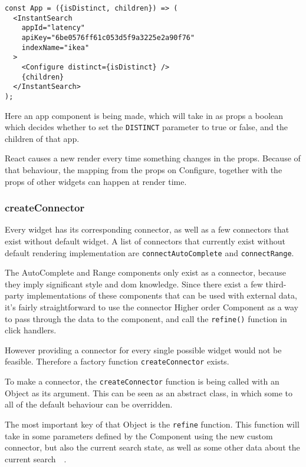 \begin{minipage}{\linewidth}
\begin{lstlisting}[caption={Configure in an InstantSearch container},label={lst:ris-configure}]
const App = ({isDistinct, children}) => (
  <InstantSearch
    appId="latency"
    apiKey="6be0576ff61c053d5f9a3225e2a90f76"
    indexName="ikea"
  >
    <Configure distinct={isDistinct} />
    {children}
  </InstantSearch>
);
\end{lstlisting}
\end{minipage}

Here an app component is being made, which will take in as \gls{props} a boolean which decides whether to set the {\tt DISTINCT} parameter to true or false, and the children of that app.

React causes a new render every time something changes in the \gls{props}. Because of that behaviour, the mapping from the \gls{props} on Configure, together with the \gls{props} of other widgets can happen at render time.

\subsubsection{createConnector}
\label{ssub:ris-createconnector}

Every widget has its corresponding connector, as well as a few connectors that exist without default widget. A list of connectors that currently exist without default rendering implementation are {\tt connectAutoComplete} and {\tt connectRange}.

The AutoComplete and Range components only exist as a connector, because they imply significant style and \acrshort{dom} knowledge. Since there exist a few third-party implementations of these components that can be used with external data, it's fairly straightforward to use the connector Higher order Component as a way to pass through the data to the component, and call the {\tt refine()} function in click handlers. 

However providing a connector for every single possible widget would not be feasible. Therefore a factory function {\tt createConnector} exists.

To make a connector, the {\tt createConnector} function is being called with an Object as its argument. This can be seen as an abstract class, in which some to all of the default behaviour can be overridden. 

The most important key of that Object is the {\tt refine} function. This function will take in some parameters defined by the Component using the new custom connector, but also the current search state, as well as some other data about the current search~\cite{react-instantsearch-custom-connectors}~.

